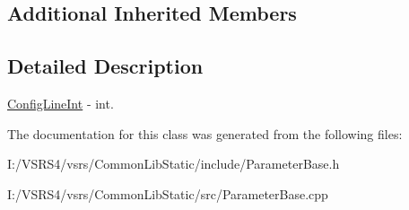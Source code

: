 \subsection*{Additional Inherited Members}


\subsection{Detailed Description}
\hyperlink{class_config_line_int}{Config\+Line\+Int} -\/ int. 

The documentation for this class was generated from the following files\+:\begin{DoxyCompactItemize}
\item 
I\+:/\+V\+S\+R\+S4/vsrs/\+Common\+Lib\+Static/include/Parameter\+Base.\+h\item 
I\+:/\+V\+S\+R\+S4/vsrs/\+Common\+Lib\+Static/src/Parameter\+Base.\+cpp\end{DoxyCompactItemize}
